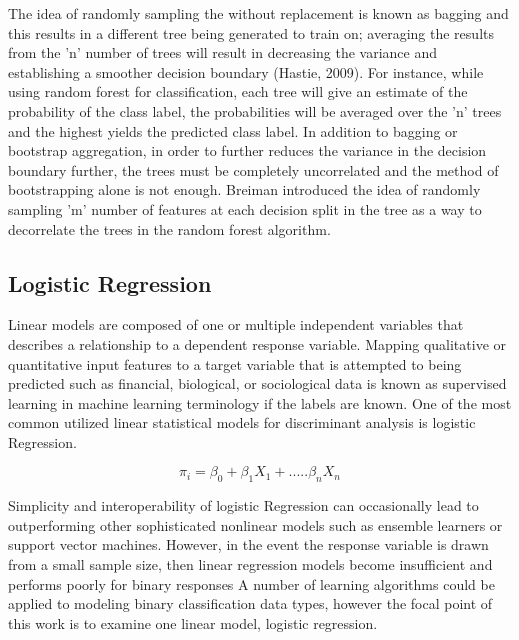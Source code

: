\documentclass{llncs}
\begin{document}
The idea of randomly sampling the without replacement is known as bagging and this results in a different tree being generated to train on; averaging the results from the 'n' number of trees will result in decreasing the variance and establishing a smoother decision boundary (Hastie,  2009). For instance, while using random forest for classification, each tree will give an estimate of the probability of the class label, the probabilities will be averaged over the 'n' trees and the highest yields the predicted class label. In addition to bagging or bootstrap aggregation, in order to further reduces the variance in the decision boundary further, the trees must be completely uncorrelated and the method of bootstrapping alone is not enough. Breiman introduced the idea of randomly sampling 'm' number of features at each decision split in the tree as a way to decorrelate the trees in the random forest algorithm.  



\subsection{Logistic Regression}


Linear models are composed of one or multiple independent variables that describes a relationship to a dependent response variable. Mapping qualitative or quantitative input features to a target variable that is attempted to being predicted such as financial, biological, or sociological data is known as supervised learning in machine learning terminology if the labels are known.  One of the most common utilized linear statistical models for discriminant analysis is logistic Regression.

\begin{equation}
\pi_{i} = \beta_{0} + \beta_{1}X_{1} + .....\beta_{n}X_{n}
\end{equation}

Simplicity and interoperability of logistic Regression can occasionally lead to outperforming other sophisticated nonlinear models such as ensemble learners or support vector machines. However, in the event the response variable is drawn from a small sample size, then linear regression models become insufficient and performs poorly for binary responses A number of learning algorithms could be applied to modeling binary classification data types, however the focal point of this work is to examine one linear model, logistic regression. 
 
\end{document}
